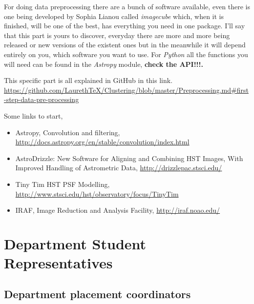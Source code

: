 \documentclass[11pt,fleqn]{book} %
\begin{document}
For doing data preprocessing there are a bunch of software available, even there is one being developed by Sophia Lianou called \emph{imagecube} which, when it is finished, will be one of the best, has everything you need in one package. I'll say that this part is yours to discover, everyday there are more and more being released or new versions of the existent ones but in the meanwhile it will depend entirely on you, which software you want to use. For \emph{Python} all the functions you will need can be found in the \emph{Astropy} module, \textbf{check the API!!!.}


This specific part is all explained in GitHub in this link. \url{https://github.com/LaurethTeX/Clustering/blob/master/Preprocessing.md#first-step-data-pre-processing}

\begin{remark}
	Some links to start,
    \begin{itemize}
    	\item Astropy, Convolution and filtering, \url{http://docs.astropy.org/en/stable/convolution/index.html}
        \item AstroDrizzle: New Software for Aligning and Combining
HST Images, With Improved Handling of Astrometric Data, \url{http://drizzlepac.stsci.edu/}
		\item Tiny Tim HST PSF Modelling, \url{http://www.stsci.edu/hst/observatory/focus/TinyTim}
        \item IRAF, Image Reduction and Analysis Facility, \url{http://iraf.noao.edu/}
    \end{itemize}
\end{remark}




\chapter{Department Student Representatives}

\section{Department placement coordinators}\par
\end{document}
